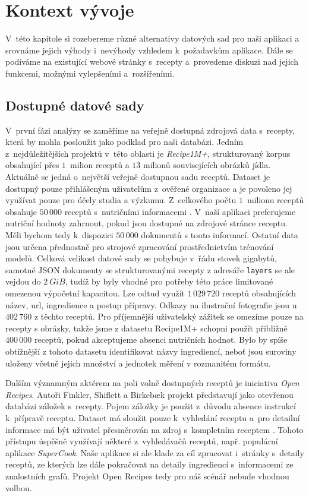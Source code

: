 
\chapter{Kontext vývoje}

V~této kapitole si rozebereme různé alternativy datových sad pro naši aplikaci a srovnáme jejich výhody i~nevýhody vzhledem k~požadavkům aplikace. Dále se podíváme na existující webové stránky s~recepty a~provedeme diskuzi nad jejich funkcemi, možnými vylepšeními a~rozšířeními.

\section{Dostupné datové sady}

V~první fázi analýzy se zaměříme na veřejně dostupná zdrojová data s~recepty, která by mohla posloužit jako podklad pro naši databázi. Jedním z~nejdůležitějších projektů v~této oblasti je \emph{Recipe1M+}, strukturovaný korpus obsahující přes $1$~milion receptů a $13$ milionů souvisejících obrázků jídla. Aktuálně se jedná o~největší veřejně dostupnou sadu receptů. Dataset je dostupný pouze přihlášeným uživatelům z~ověřené organizace a je povoleno jej využívat pouze pro účely studia a výzkumu. Z~celkového počtu $1$~milionu receptů obsahuje $50\,000$ receptů s~nutričními informacemi \citep{marin2019learning}. V~naší aplikaci preferujeme nutriční hodnoty zahrnout, pokud jsou dostupné na zdrojové stránce receptu. Měli bychom tedy k~dispozici $50\,000$ dokumentů s touto informací. Ostatní data jsou určena přednostně pro strojové zpracování prostřednictvím trénování modelů. Celková velikost datové sady se pohybuje v~řádu stovek gigabytů, samotné JSON dokumenty se strukturovanými recepty z adresáře \texttt{layers} se ale vejdou do $2~GiB$, tudíž by byly vhodné pro potřeby této práce limitované omezenou výpočetní kapacitou. Lze odtud využít $1\,029\,720$ receptů obsahujících název, url, ingredience a postup přípravy. Odkazy na ilustrační fotografie jsou u $402\,760$ z těchto receptů. Pro příjemnější uživatelský zážitek se omezíme pouze na recepty s obrázky, takže jsme z datasetu Recipe1M+ schopni použít přibližně $400\,000$ receptů, pokud akceptujeme absenci nutričních hodnot. Bylo by spíše obtížnější z tohoto datasetu identifikovat názvy ingrediencí, neboť jsou suroviny uloženy včetně jejich množství a jednotek měření v rozmanitém formátu.

Dalším významným aktérem na poli volně dostupných receptů je iniciativa \emph{Open Recipes}. Autoři Finkler, Shiflett a Birkebæk projekt představují jako otevřenou databázi záložek s~recepty. Pojem záložky je použit z~důvodu absence instrukcí k~přípravě receptu. Dataset má sloužit pouze k~vyhledání receptu a~pro detailní informace má být uživatel přesměrován na zdroj s~kompletním receptem \citep{open-recipes}. Tohoto přístupu úspěšně využívají některé z~vyhledávačů receptů, např. populární aplikace \emph{SuperCook}. Naše aplikace si ale klade za cíl zpracovat i~stránky s~detaily receptů, ze kterých lze dále pokračovat na detaily ingrediencí s~informacemi ze znalostních grafů. Projekt Open Recipes tedy pro náš scénář nebude vhodnou volbou.


